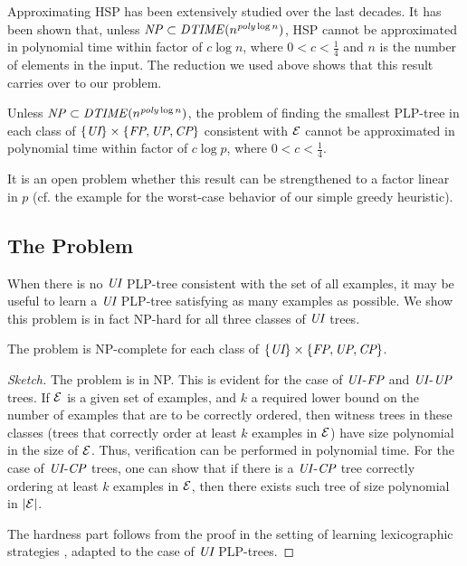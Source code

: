 Approximating HSP has been extensively studied over the last decades.
It has been shown \cite{lund1994hardness} that, unless $\mathit{NP} \subset \mathit{DTIME}(n^{\mathit{poly} \log n})$,
HSP cannot be approximated 
in polynomial time within factor of $c \log n$, where $0<c<\frac{1}{4}$ and
$n$ is the number of elements in the input. The reduction we used above
shows that this result
carries over to our problem.
\begin{thm}
\label{thm:UI_smallest_approx}
	Unless $\mathit{NP} \subset \mathit{DTIME}(n^{\mathit{poly} \log n})$,
	the problem of finding the smallest PLP-tree in each class of $\{\textit{UI}\} \times \{\textit{FP},\textit{UP},\textit{CP}\}$ 
	consistent with $\mathcal{E}$ cannot be approximated 
	in polynomial time within factor of $c \log p$, where $0<c<\frac{1}{4}$.
\end{thm}
It is an open problem whether this result can be strengthened to a factor 
linear in $p$ (cf. the example for the worst-case behavior of our simple 
greedy heuristic).


\vspace{-0.1cm}
\subsection{The  Problem}

\vspace{-0.1cm}
When there is no $\textit{UI}$ PLP-tree consistent with the set of all examples,
it may be useful to learn a $\textit{UI}$ PLP-tree satisfying as many examples 
as possible. We show this problem is in fact NP-hard for all three 
classes of $\textit{UI}$ trees.

\begin{thm}
\label{thm:UIFP_least_decision}
The  problem is NP-complete for each class of $\{\textit{UI}\} \times \{\textit{FP},\textit{UP},\textit{CP}\}$.
\end{thm}
\begin{proof}[Sketch]
The problem is in NP. This is evident for the case
of $\textit{UI}$-$\textit{FP}$ and $\textit{UI}$-$\textit{UP}$ trees. If $\mathcal{E}$ is a given set of examples,
and $k$ a required lower bound on the number of examples that are to be 
correctly ordered, then witness trees in these classes (trees that correctly 
order at least $k$ examples in $\mathcal{E}$) have size polynomial in the size of 
$\mathcal{E}$. Thus, verification can be performed in polynomial time. 
For the case of $\textit{UI}$-$\textit{CP}$ trees, one can show that if there is a $\textit{UI}$-$\textit{CP}$
tree correctly ordering at least $k$ examples in $\mathcal{E}$, then there exists
such tree of size polynomial in $|\mathcal{E}|$.

The hardness part follows from the proof in the setting of learning 
lexicographic strategies \cite{schmitt2006complexity}, adapted to the case 
of $\textit{UI}$ PLP-trees.
\end{proof}

